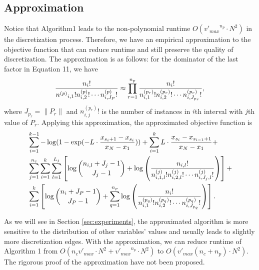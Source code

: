\subsection{Approximation}
\label{approx}
Notice that Algorithm1 leads to the non-polynomial runtime $O({v'_{max}}^{n_p} \cdot N^2)$ in the discretization process. Therefore, we have an empirical approximation to the objective function that can reduce runtime and still preserve the quality of discretization. The approximation is as follows: for the dominator of the last factor in Equation 11, we have
\begin{equation}
{{{{n}_i}!}\over{ {{n^{(p)}}_{i,1} !} {n^{(p)}_{i,2} !} \cdots {n^{(p)}_{i,J_P} !}}} \approx \prod_{r=1}^{n_p} { {{{n}_i}!}\over{ {n^{(p_r)}_{i,1} !} {n^{(p_r)}_{i,2} !} \cdots {n^{(p_r)}_{i,J_{p_r}} !}}},
\end{equation}
where $J_{p_r} = \| P_r\|$ and ${n^{(p_r)}_{i,j} !}$ is the number of instances in $i$th interval with $j$th value of $P_r$. Applying this approximation, the approximated objective function is
\begin{equation}
\begin{aligned}
& \sum_{i=1}^{k-1} - \log(1 - {\exp(- L \cdot {{x_{s_i+1} - x_{s_i}}\over{x_N - x_1}})}) +  \sum_{i=1}^{k} L \cdot {{x_{s_{i}} - x_{s_{i-1} + 1}}\over{x_N - x_1}} +\\
&  \sum_{j=1}^{n_c} \sum_{i=1}^{k}  \sum_{l=1}^{L_j} \left[  \log{{n_{i,l} + J_j - 1}\choose{J_j-1}} + \log \left( { {{n_{i,l}}!}\over{ {n^{(j)}_{i,1,l} !} {n^{(j)}_{i,2,l} !} \cdots {n^{(j)}_{i,J_j,l} !}} } \right) \right] + \\
& \sum_{i=1}^k \left[  \log {{n_{i} + J_P - 1}\choose{J_P-1}} + \sum_{q=1}^{n_p} \log \left( { {{{n}_i}!}\over{ {n^{(p_q)}_{i,1} !} {n^{(p_q)}_{i,2} !} \cdots {n^{(p_q)}_{i,J_{p_q}} !}}} \right) \right].
\end{aligned}
\end{equation}


As we will see in Section \ref{sec:experiments}, the approximated algorithm is more sensitive to the distribution of other variables' values and usually leads to slightly more discretization edges. With the approximation, we can reduce runtime of Algorithm 1 from $O(n_c  {v'_{max}} \cdot N^2 + {v'_{max}}^{n_p} \cdot N^2)$ to $O( {v'_{max}} (n_c + n_p) \cdot N^2)$. The rigorous proof of the approximation have not been proposed.

